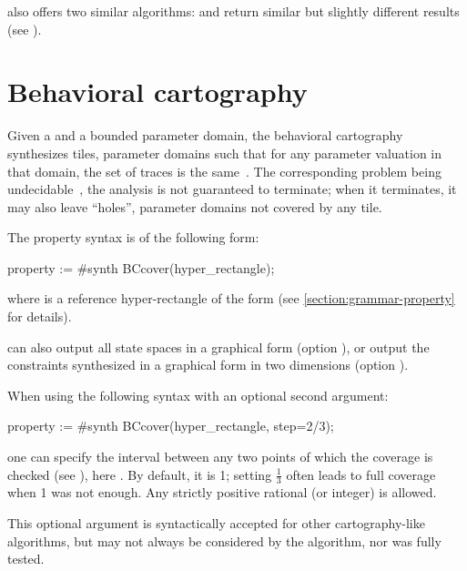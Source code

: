 \imitator{} also offers two similar algorithms:  and  return similar but slightly different results (see \cite{AS11}).


\section{Behavioral cartography}\label{section:algorithm:BC}

Given a \NIPTA{} and a bounded parameter domain, the behavioral cartography~\BC{} synthesizes tiles, \ie{} parameter domains such that for any parameter valuation in that domain, the set of traces is the same~\cite{AF10}.
The corresponding problem being undecidable~\cite{ALM20}, the analysis is not guaranteed to terminate; when it terminates, it may also leave ``holes'', \ie{} parameter domains not covered by any tile.

The property syntax is of the following form:

\begin{IMITATORproperty}
property := #synth BCcover(hyper_rectangle);
\end{IMITATORproperty}

\noindent{}
where  is a reference hyper-rectangle of the form  (see \cref{section:grammar-property} for details).


\imitator{} can also
output all state spaces in a graphical form (option ),
or
output the constraints synthesized in a graphical form in two dimensions (option ).

When using the following syntax with an optional second argument:

\begin{IMITATORproperty}
property := #synth BCcover(hyper_rectangle, step=2/3);
\end{IMITATORproperty}

\noindent one can specify the interval between any two points of which the coverage is checked (see \cite{AF10}), here .
By default, it is 1; setting $\frac{1}{3}$ often leads to full coverage when 1 was not enough.
Any strictly positive rational (or integer) is allowed.

\begin{becareful}
	This optional argument is syntactically accepted for other cartography-like algorithms, but may not always be considered by the algorithm, nor was fully tested.
\end{becareful}

